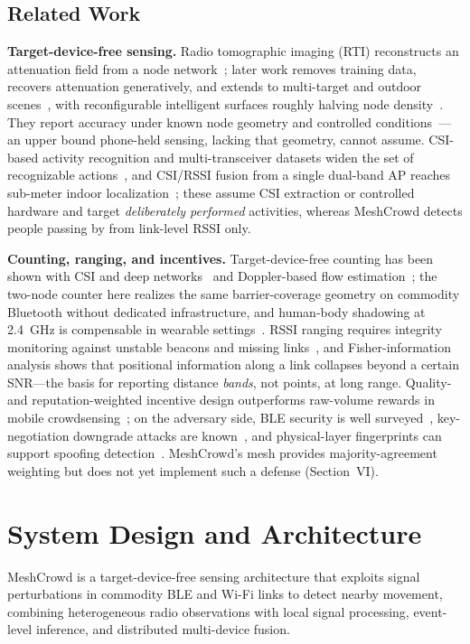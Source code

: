 \documentclass[journal,10pt]{IEEEtran}
\begin{document}
\subsection{Related Work}
\textbf{Target-device-free sensing.} Radio tomographic imaging (RTI)
reconstructs an attenuation field from a node network~\cite{wilson2010};
later work removes training data, recovers attenuation generatively, and
extends to multi-target and outdoor scenes~\cite{alippi2016,wu2024}, with
reconfigurable intelligent surfaces roughly halving node
density~\cite{li2024}. They report accuracy under known node geometry and
controlled conditions~\cite{wilson2011}---an upper bound phone-held sensing,
lacking that geometry, cannot assume. CSI-based activity recognition and
multi-transceiver datasets widen the set of recognizable
actions~\cite{wang2015har,wong2024}, and CSI/RSSI fusion from a single
dual-band AP reaches sub-meter indoor localization~\cite{sanchez2020}; these
assume CSI extraction or controlled hardware and target \emph{deliberately
performed} activities, whereas MeshCrowd detects people passing by from
link-level RSSI only.

\textbf{Counting, ranging, and incentives.} Target-device-free counting has
been shown with CSI and deep networks~\cite{khan2023} and Doppler-based flow
estimation~\cite{zhou2020}; the two-node counter here realizes the same
barrier-coverage geometry on commodity Bluetooth without dedicated
infrastructure, and human-body shadowing at 2.4~GHz is compensable in
wearable settings~\cite{januszkiewicz2018}. RSSI ranging requires integrity
monitoring against unstable beacons and missing links~\cite{ramirez2021}, and
Fisher-information analysis shows that positional information along a link
collapses beyond a certain SNR---the basis for reporting distance \emph{bands},
not points, at long range. Quality- and reputation-weighted incentive design
outperforms raw-volume rewards in mobile crowdsensing~\cite{zhang2022,wang2018};
on the adversary side, BLE security is well surveyed~\cite{casar2022},
key-negotiation downgrade attacks are known~\cite{antonioli2020}, and
physical-layer fingerprints can support spoofing
detection~\cite{ryan2013woot}. MeshCrowd's mesh provides majority-agreement
weighting but does not yet implement such a defense (Section~VI).

\section{System Design and Architecture}
MeshCrowd is a target-device-free sensing architecture that exploits signal
perturbations in commodity BLE and Wi-Fi links to detect nearby movement,
combining heterogeneous radio observations with local signal processing,
event-level inference, and distributed multi-device fusion.
\end{document}
